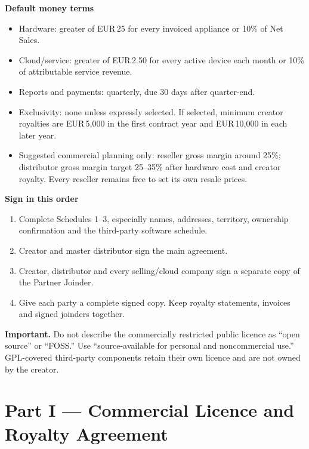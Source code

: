 \documentclass[11pt,a4paper]{article}
\newcommand{\money}{EUR\,}
\newcommand{\warning}[1]{%
  \par\medskip\noindent
  \colorbox{papergray}{\parbox{0.94\linewidth}{\textbf{Important.} #1}}
  \par\medskip
}
\begin{document}
\textbf{Default money terms}
\begin{itemize}
  \item Hardware: greater of \money25 for every invoiced appliance or 10\% of Net Sales.
  \item Cloud/service: greater of \money2.50 for every active device each month or 10\% of attributable service revenue.
  \item Reports and payments: quarterly, due 30 days after quarter-end.
  \item Exclusivity: none unless expressly selected. If selected, minimum creator royalties are \money5,000 in the first contract year and \money10,000 in each later year.
  \item Suggested commercial planning only: reseller gross margin around 25\%; distributor gross margin target 25--35\% after hardware cost and creator royalty. Every reseller remains free to set its own resale prices.
\end{itemize}

\textbf{Sign in this order}
\begin{enumerate}
  \item Complete Schedules 1--3, especially names, addresses, territory, ownership confirmation and the third-party software schedule.
  \item Creator and master distributor sign the main agreement.
  \item Creator, distributor and every selling/cloud company sign a separate copy of the Partner Joinder.
  \item Give each party a complete signed copy. Keep royalty statements, invoices and signed joinders together.
\end{enumerate}

\warning{Do not describe the commercially restricted public licence as ``open source'' or ``FOSS.'' Use ``source-available for personal and noncommercial use.'' GPL-covered third-party components retain their own licence and are not owned by the creator.}

\newpage
\tableofcontents
\newpage

\part*{Part I --- Commercial Licence and Royalty Agreement}
\end{document}
